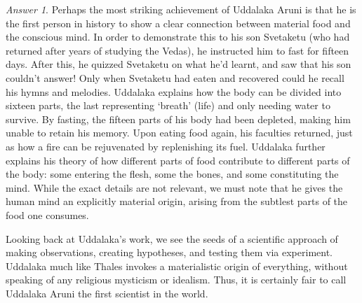 \documentclass[11pt]{article}
\theoremstyle{remark}
\newtheorem*{answer}{Answer}
\begin{document}
\begin{answer}
        Perhaps the most striking achievement of Uddalaka Aruni is that he is the
        first person in history to show a clear connection between material food and
        the conscious mind. In order to demonstrate this to his son Svetaketu (who
        had returned after years of studying the Vedas), he instructed him to fast
        for fifteen days. After this, he quizzed Svetaketu on what he'd learnt, and
        saw that his son couldn't answer! Only when Svetaketu had eaten and recovered
        could he recall his hymns and melodies. Uddalaka explains how the body can be
        divided into sixteen parts, the last representing `breath' (life) and only
        needing water to survive. By fasting, the fifteen parts of his body had been
        depleted, making him unable to retain his memory. Upon eating food again, his
        faculties returned, just as how a fire can be rejuvenated by replenishing its
        fuel. Uddalaka further explains his theory of how different parts of food
        contribute to different parts of the body: some entering the flesh, some the
        bones, and some constituting the mind. While the exact details are not
        relevant, we must note that he gives the human mind an explicitly material
        origin, arising from the subtlest parts of the food one consumes.

        Looking back at Uddalaka's work, we see the seeds of a scientific approach of
        making observations, creating hypotheses, and testing them via experiment.
        Uddalaka much like Thales invokes a materialistic origin of everything,
        without speaking of any religious mysticism or idealism. Thus, it is
        certainly fair to call Uddalaka Aruni the first scientist in the world.
    \end{answer}
\end{document}
